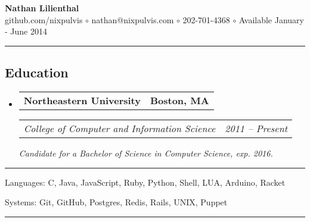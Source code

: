 \documentclass[10pt,letterpaper]{article}
\makeatletter
\newenvironment{indentsection}[1]
{\begin{list}{}
  {\setlength{\leftmargin}{#1}} \item[]
}
{\end{list}}
\newcommand{\headerrow}[2]
{\begin{tabular*}{\linewidth}{l@{\extracolsep{\fill}}r}
  #1 &
  #2 \\
\end{tabular*}}
\makeatother
\begin{document}
\begin{center}
  \huge \textbf{Nathan Lilienthal} \\
  \large
  github.com/nixpulvis
  $\circ$
  nathan@nixpulvis.com
  $\circ$
  202-701-4368
  $\circ$
  Available January - June 2014
  \vspace{-0.2em}
\end{center}

\hrule
\vspace{-0.4em}
\subsection*{Education}
\begin{itemize}
  \parskip=0.1em

  \item
  \headerrow
    {\textbf{Northeastern University}}
    {\textbf{Boston, MA}}
  \headerrow
    {\emph{College of Computer and Information Science}}
    {\emph{2011 -- Present}}
    {\emph{Candidate for a Bachelor of Science in Computer Science, exp. 2016.}}
\end{itemize}


\hrule
\begin{indentsection}{\parindent}
\begin{description*}
  \item[Languages:]
  C, Java, JavaScript, Ruby, Python, Shell, LUA, Arduino, Racket
  \item[Systems:]
  Git, GitHub, Postgres, Redis, Rails, UNIX, Puppet
\end{description*}
\end{indentsection}


\hrule
\vspace{-0.4em}
\end{document}
